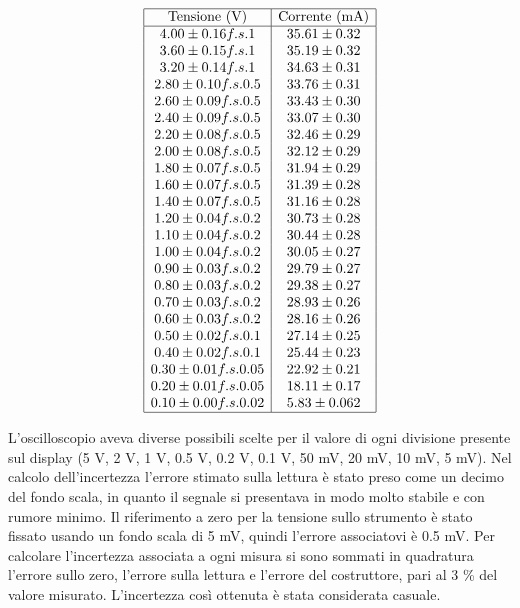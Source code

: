 \documentclass[a4paper,11pt]{article}
\begin{document}
    \begin{minipage}{0.4\textwidth}
        \[
\begin{array}{|c|c|}
\hline
\text{Tensione (V)} & \text{Corrente (mA)} \\ \hline
4.00 \pm 0.16 f.s. 1 & 35.61 \pm 0.32 \\ 
3.60 \pm 0.15 f.s. 1 & 35.19 \pm 0.32 \\ 
3.20 \pm 0.14 f.s. 1 & 34.63 \pm 0.31 \\ 
2.80 \pm 0.10 f.s. 0.5 & 33.76 \pm 0.31 \\ 
2.60 \pm 0.09 f.s. 0.5 & 33.43 \pm 0.30 \\ 
2.40 \pm 0.09 f.s. 0.5 & 33.07 \pm 0.30 \\ 
2.20 \pm 0.08 f.s. 0.5 & 32.46 \pm 0.29 \\ 
2.00 \pm 0.08 f.s. 0.5 & 32.12 \pm 0.29 \\ 
1.80 \pm 0.07 f.s. 0.5 & 31.94 \pm 0.29 \\ 
1.60 \pm 0.07 f.s. 0.5 & 31.39 \pm 0.28 \\ 
1.40 \pm 0.07 f.s. 0.5 & 31.16 \pm 0.28 \\ 
1.20 \pm 0.04 f.s. 0.2 & 30.73 \pm 0.28 \\ 
1.10 \pm 0.04 f.s. 0.2 & 30.44 \pm 0.28 \\ 
1.00 \pm 0.04 f.s. 0.2 & 30.05 \pm 0.27 \\ 
0.90 \pm 0.03 f.s. 0.2 & 29.79 \pm 0.27 \\ 
0.80 \pm 0.03 f.s. 0.2 & 29.38 \pm 0.27 \\ 
0.70 \pm 0.03 f.s. 0.2 & 28.93 \pm 0.26 \\ 
0.60 \pm 0.03 f.s. 0.2 & 28.16 \pm 0.26 \\ 
0.50 \pm 0.02 f.s. 0.1 & 27.14 \pm 0.25 \\ 
0.40 \pm 0.02 f.s. 0.1 & 25.44 \pm 0.23 \\ 
0.30 \pm 0.01 f.s. 0.05 & 22.92 \pm 0.21 \\ 
0.20 \pm 0.01 f.s. 0.05 & 18.11 \pm 0.17 \\ 
0.10 \pm 0.00 f.s. 0.02 & 5.83 \pm 0.062 \\ \hline
\label{tab::dati_200}
\end{array}
\]    
    \end{minipage}


L'oscilloscopio aveva diverse possibili scelte per il valore di ogni divisione presente sul display (5 V, 2 V, 1 V, 0.5 V, 0.2 V, 0.1 V, 50 mV, 20 mV, 10 mV, 5 mV). Nel calcolo dell'incertezza l'errore stimato sulla lettura è stato preso come un decimo del fondo scala, in quanto il segnale si presentava in modo molto stabile e con rumore minimo. Il riferimento a zero per la tensione sullo strumento è stato fissato usando un fondo scala di 5 mV, quindi l'errore associatovi è 0.5 mV. Per calcolare l'incertezza associata a ogni misura si sono sommati in quadratura l'errore sullo zero, l'errore sulla lettura e l'errore del costruttore, pari al 3 \% del valore misurato. L'incertezza così ottenuta è stata considerata casuale.
 
\end{document}
